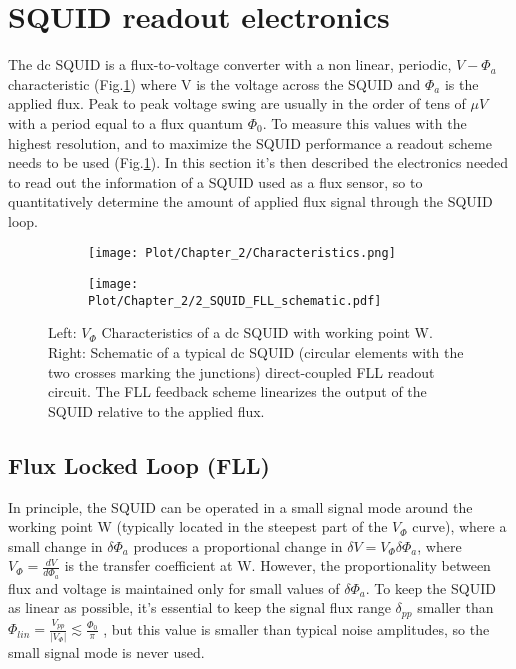\documentclass[12pt,a4paper]{report}
\begin{document}
    \section{SQUID readout electronics}
    The dc SQUID is a flux-to-voltage converter with a non linear, periodic, $V-\Phi_a$ characteristic (Fig.\ref{SQUID_readout}) where V is the voltage across the SQUID and $\Phi_a$ is the applied flux. Peak to peak voltage swing are usually in the order of tens of $\mu V$ with a period equal to a flux quantum $\Phi_0$. To measure this values with the highest resolution, and to maximize the SQUID performance a readout scheme needs to be used (Fig.\ref{SQUID_readout}). In this section it's then described the electronics needed to read out the information of a SQUID used as a flux sensor, so to quantitatively determine the amount of applied flux signal through the SQUID loop.
    \begin{figure}[h]
    	\centering
    	\begin{subfigure}[b]{0.49\textwidth}
    		\centering
    		\texttt{[image: Plot/Chapter\_2/Characteristics.png]}
    	\end{subfigure}
    	\hfill
    	\begin{subfigure}[b]{0.5\textwidth}
    		\centering
    		\texttt{[image: Plot/Chapter\_2/2\_SQUID\_FLL\_schematic.pdf]}
    	\end{subfigure}
    	\caption{Left: $V_\Phi$ Characteristics of a dc SQUID with working point W. Right: Schematic of a typical dc SQUID (circular elements with the two crosses marking the junctions) direct-coupled FLL readout circuit. The FLL feedback scheme linearizes the output of the SQUID relative to the applied flux.}
    	\label{SQUID_readout}
    \end{figure}
    \subsection{Flux Locked Loop (FLL)}
    In principle, the SQUID can be operated in a small signal mode around the working point W (typically located in the steepest part of the $V_\Phi$ curve), where a small change in $\delta\Phi_a$ produces a proportional change in $\delta V = V_{\Phi} \delta\Phi_a$, where $V_{\Phi} = \frac{dV}{d\Phi_a}$ is the transfer coefficient at W. However, the proportionality between flux and voltage is maintained only for small values of $\delta\Phi_a$. To keep the SQUID as linear as possible, it's essential to keep the signal flux range $\delta_{pp}$ smaller than $\Phi_{lin} = \frac{V_{pp}}{|V_{\Phi}|} \lesssim \frac{\Phi_0}{\pi}$ \cite{Squid_handbook_1}, but this value is smaller than typical noise amplitudes, so the small signal mode is never used.
    
\end{document}
